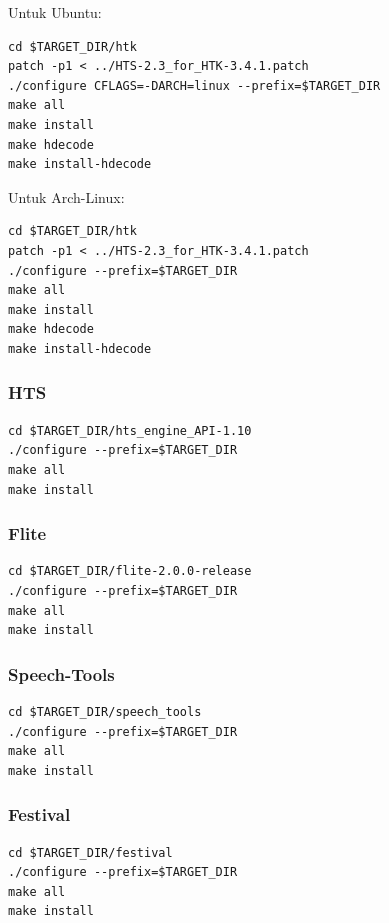 \documentclass[12pt,]{article}
\begin{document}
	Untuk Ubuntu:
	\begin{verbatim}
cd $TARGET_DIR/htk
patch -p1 < ../HTS-2.3_for_HTK-3.4.1.patch
./configure CFLAGS=-DARCH=linux --prefix=$TARGET_DIR
make all
make install
make hdecode
make install-hdecode
	\end{verbatim}

	\newpage
	Untuk Arch-Linux:
	\begin{verbatim}
cd $TARGET_DIR/htk
patch -p1 < ../HTS-2.3_for_HTK-3.4.1.patch
./configure --prefix=$TARGET_DIR
make all
make install
make hdecode
make install-hdecode
	\end{verbatim}

	\subsubsection{HTS}
	\begin{verbatim}
cd $TARGET_DIR/hts_engine_API-1.10
./configure --prefix=$TARGET_DIR
make all
make install
	\end{verbatim}

	\subsubsection{Flite}
	\begin{verbatim}
cd $TARGET_DIR/flite-2.0.0-release
./configure --prefix=$TARGET_DIR
make all
make install
	\end{verbatim}

	\subsubsection{Speech-Tools}
	\begin{verbatim}
cd $TARGET_DIR/speech_tools
./configure --prefix=$TARGET_DIR
make all
make install
	\end{verbatim}

	\subsubsection{Festival}
	\begin{verbatim}
cd $TARGET_DIR/festival
./configure --prefix=$TARGET_DIR
make all
make install
	\end{verbatim}
\end{document}
